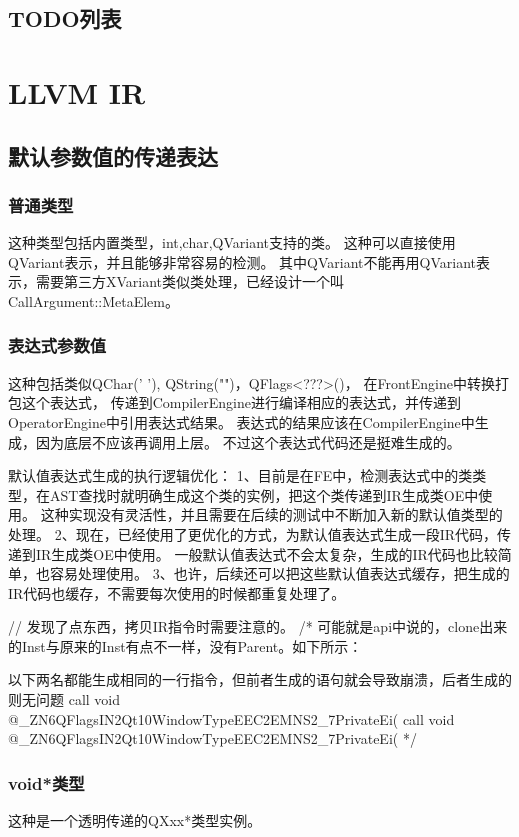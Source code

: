 \section{TODO列表}

\chapter{LLVM IR}
\section{默认参数值的传递表达}
\subsection{普通类型}
这种类型包括内置类型，int,char,QVariant支持的类。
这种可以直接使用QVariant表示，并且能够非常容易的检测。
其中QVariant不能再用QVariant表示，需要第三方XVariant类似类处理，已经设计一个叫CallArgument::MetaElem。

\subsection{表达式参数值}
这种包括类似QChar(' '), QString("")，QFlags<???>()，
在FrontEngine中转换打包这个表达式，
传递到CompilerEngine进行编译相应的表达式，并传递到OperatorEngine中引用表达式结果。
表达式的结果应该在CompilerEngine中生成，因为底层不应该再调用上层。
不过这个表达式代码还是挺难生成的。

默认值表达式生成的执行逻辑优化：
1、目前是在FE中，检测表达式中的类类型，在AST查找时就明确生成这个类的实例，把这个类传递到IR生成类OE中使用。
这种实现没有灵活性，并且需要在后续的测试中不断加入新的默认值类型的处理。
2、现在，已经使用了更优化的方式，为默认值表达式生成一段IR代码，传递到IR生成类OE中使用。
一般默认值表达式不会太复杂，生成的IR代码也比较简单，也容易处理使用。
3、也许，后续还可以把这些默认值表达式缓存，把生成的IR代码也缓存，不需要每次使用的时候都重复处理了。

// 发现了点东西，拷贝IR指令时需要注意的。
/*
  可能就是api中说的，clone出来的Inst与原来的Inst有点不一样，没有Parent。如下所示：

  以下两名都能生成相同的一行指令，但前者生成的语句就会导致崩溃，后者生成的则无问题
  call void @_ZN6QFlagsIN2Qt10WindowTypeEEC2EMNS2_7PrivateEi(%
  call void @_ZN6QFlagsIN2Qt10WindowTypeEEC2EMNS2_7PrivateEi(%
*/


\subsection{void*类型}
这种是一个透明传递的QXxx*类型实例。

